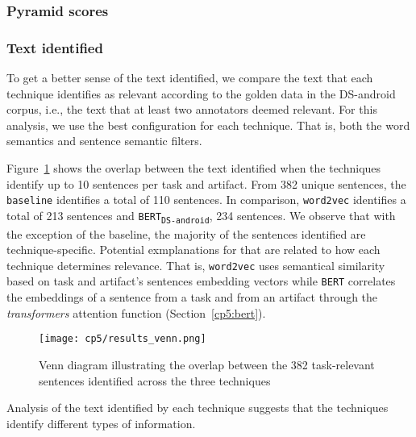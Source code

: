 \subsubsection{Pyramid scores}




\subsubsection{Text identified}


To get a better sense of the text identified, we compare the text that each technique identifies as relevant according to the golden data in the \acs{DS-android} corpus, i.e., the text that at least two annotators deemed relevant. For this analysis, 
we use the best configuration for each technique. That is, both the word semantics and sentence semantic filters.



Figure~\ref{fig:text-overlap} shows the overlap between the text identified when the techniques identify up to 10 
sentences per task and artifact.
From 382 unique sentences, the \texttt{baseline} identifies a total of 110 sentences. In comparison, \texttt{word2vec} identifies a total of 213 sentences and \texttt{BERT\textsubscript{DS-android}}, 234 sentences. 
We observe that with the exception of the baseline, the majority of the sentences 
identified are technique-specific. Potential exmplanations for that are related to how each technique 
determines relevance. That is, \texttt{word2vec} uses semantical similarity based on task and artifact's sentences embedding vectors while 
\texttt{BERT} correlates the embeddings of a sentence from a task and from an artifact through the 
\textit{transformers} attention function (Section~\ref{cp5:bert}).




\begin{figure}
    \centering
    \texttt{[image: cp5/results\_venn.png]}
    \caption{Venn diagram illustrating the overlap between the 382 task-relevant sentences identified across the three techniques}
    \label{fig:text-overlap}
\end{figure}


Analysis of the text identified by each technique suggests that the techniques identify different types of information.


